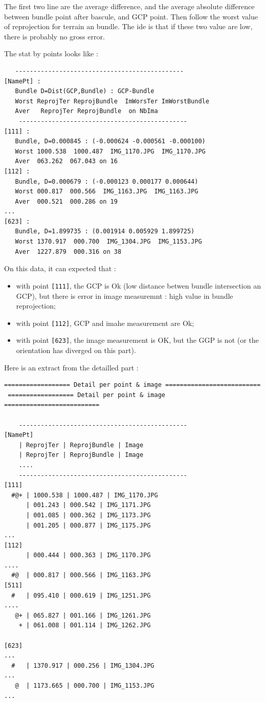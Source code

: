 The first two line are the average difference, and the average absolute difference between
bundle point after bascule, and GCP point. Then follow the worst value of reprojection
for terrain an bundle. The ide is  that if these two value are low, there is probably
no gross error.

The stat by points looks like :


\begin{verbatim}
   ----------------------------------------------
[NamePt] :
   Bundle D=Dist(GCP,Bundle) : GCP-Bundle
   Worst ReprojTer ReprojBundle  ImWorsTer ImWorstBundle
   Aver   ReprojTer ReprojBundle  on NbIma
    ----------------------------------------------
[111] :
   Bundle, D=0.000845 : (-0.000624 -0.000561 -0.000100)
   Worst 1000.538  1000.487  IMG_1170.JPG  IMG_1170.JPG
   Aver  063.262  067.043 on 16
[112] :
   Bundle, D=0.000679 : (-0.000123 0.000177 0.000644)
   Worst 000.817  000.566  IMG_1163.JPG  IMG_1163.JPG
   Aver  000.521  000.286 on 19
...
[623] :
   Bundle, D=1.899735 : (0.001914 0.005929 1.899725)
   Worst 1370.917  000.700  IMG_1304.JPG  IMG_1153.JPG
   Aver  1227.879  000.316 on 38
\end{verbatim}


On this data, it can expected that :

\begin{itemize}
   \item with point {\tt [111]}, the GCP is Ok (low distance betwen bundle intersection an GCP),
         but there is error in image measuremnt : high value in bundle reprojection;

   \item with point {\tt [112]}, GCP and imahe measurement are Ok;

   \item with point {\tt [623]}, the image measurement is OK, but the GGP is not (or the orientation
         has diverged on this part).
\end{itemize}

Here is an extract from the detailled part :

\begin{verbatim}
================== Detail per point & image ==========================
 ================== Detail per point & image ==========================

    ----------------------------------------------
[NamePt]
    | ReprojTer | ReprojBundle | Image
    | ReprojTer | ReprojBundle | Image
    ....
    ----------------------------------------------
[111]
  #@+ | 1000.538 | 1000.487 | IMG_1170.JPG
      | 001.243 | 000.542 | IMG_1171.JPG
      | 001.085 | 000.362 | IMG_1173.JPG
      | 001.205 | 000.877 | IMG_1175.JPG
...
[112]
      | 000.444 | 000.363 | IMG_1170.JPG
....
  #@  | 000.817 | 000.566 | IMG_1163.JPG
[511]
  #   | 095.410 | 000.619 | IMG_1251.JPG
....
   @+ | 065.827 | 001.166 | IMG_1261.JPG
    + | 061.008 | 001.114 | IMG_1262.JPG

[623]
...
  #   | 1370.917 | 000.256 | IMG_1304.JPG
...
   @  | 1173.665 | 000.700 | IMG_1153.JPG
...
\end{verbatim}

